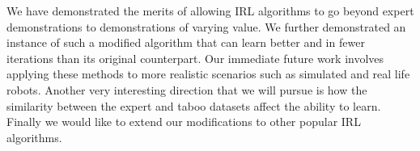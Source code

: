 \documentclass[conference]{IEEEtran}
\begin{document}
	We have demonstrated the merits of allowing IRL algorithms to go beyond expert demonstrations to demonstrations of varying value. We further demonstrated an instance of such a modified algorithm that can learn better and in fewer iterations than its original counterpart. Our immediate future work involves applying these methods to more realistic scenarios such as simulated and real life robots. Another very interesting direction that we will pursue is how the similarity between the expert and taboo datasets affect the ability to learn. Finally we would like to extend our modifications to other popular IRL algorithms.
%
%
%
%
%
%
%
%
%  
%
\end{document}
